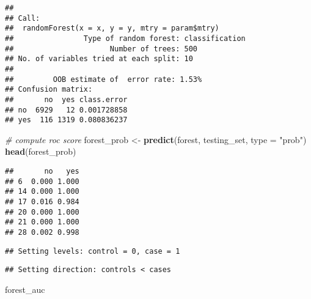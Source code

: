 \documentclass[
]{article}
\newenvironment{Shaded}{\begin{snugshade}}{\end{snugshade}}
\newcommand{\AttributeTok}[1]{\textcolor[rgb]{0.13,0.29,0.53}{#1}}
\newcommand{\CommentTok}[1]{\textcolor[rgb]{0.56,0.35,0.01}{\textit{#1}}}
\newcommand{\DecValTok}[1]{\textcolor[rgb]{0.00,0.00,0.81}{#1}}
\newcommand{\DocumentationTok}[1]{\textcolor[rgb]{0.56,0.35,0.01}{\textbf{\textit{#1}}}}
\newcommand{\FunctionTok}[1]{\textcolor[rgb]{0.13,0.29,0.53}{\textbf{#1}}}
\newcommand{\NormalTok}[1]{#1}
\newcommand{\OtherTok}[1]{\textcolor[rgb]{0.56,0.35,0.01}{#1}}
\newcommand{\SpecialCharTok}[1]{\textcolor[rgb]{0.81,0.36,0.00}{\textbf{#1}}}
\newcommand{\StringTok}[1]{\textcolor[rgb]{0.31,0.60,0.02}{#1}}
\begin{document}
\begin{Shaded}
\end{Shaded}

\begin{verbatim}
## 
## Call:
##  randomForest(x = x, y = y, mtry = param$mtry) 
##                Type of random forest: classification
##                      Number of trees: 500
## No. of variables tried at each split: 10
## 
##         OOB estimate of  error rate: 1.53%
## Confusion matrix:
##       no  yes class.error
## no  6929   12 0.001728858
## yes  116 1319 0.080836237
\end{verbatim}

\begin{Shaded}
\begin{Highlighting}[]
\CommentTok{\# compute roc score}
\NormalTok{forest\_prob }\OtherTok{\textless{}{-}} \FunctionTok{predict}\NormalTok{(forest, testing\_set, }\AttributeTok{type =} \StringTok{"prob"}\NormalTok{)}
\FunctionTok{head}\NormalTok{(forest\_prob)}
\end{Highlighting}
\end{Shaded}

\begin{verbatim}
##       no   yes
## 6  0.000 1.000
## 14 0.000 1.000
## 17 0.016 0.984
## 20 0.000 1.000
## 21 0.000 1.000
## 28 0.002 0.998
\end{verbatim}

\begin{Shaded}
\end{Shaded}

\begin{verbatim}
## Setting levels: control = 0, case = 1
\end{verbatim}

\begin{verbatim}
## Setting direction: controls < cases
\end{verbatim}

\begin{Shaded}
\begin{Highlighting}[]
\NormalTok{forest\_auc}
\end{Highlighting}
\end{Shaded}
\end{document}

